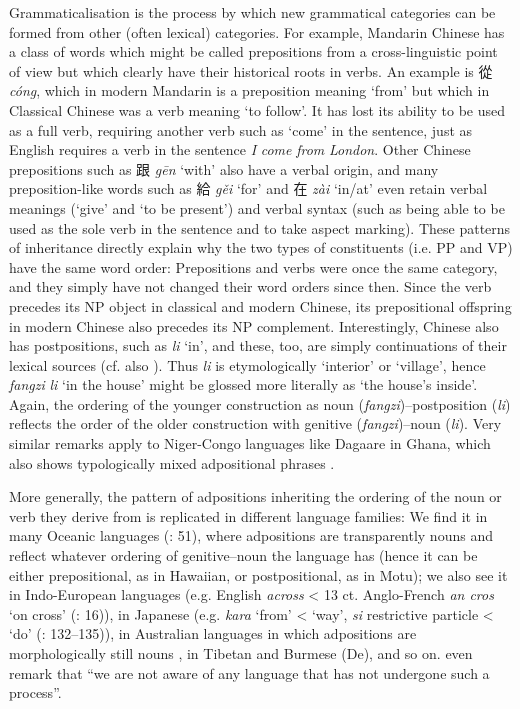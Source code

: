\documentclass[output=paper]{langsci/langscibook}
\begin{document}
Grammaticalisation is the process by which new grammatical categories can be formed from other (often lexical) categories. For example, Mandarin Chinese has a class of words which might be called prepositions from a cross-linguistic point of view but which clearly have their historical roots in verbs. An example is 從 \textit{cóng}, which in modern Mandarin is a preposition meaning ‘from’ but which in Classical Chinese was a verb meaning ‘to follow’. It has lost its ability to be used as a full verb, requiring another verb such as ‘come’ in the sentence, just as English requires a verb in the sentence \textit{I} \textit{come} \textit{from} \textit{London}. Other Chinese prepositions such as 跟 \textit{gēn} ‘with’ also have a verbal origin, and many preposition-like words such as 給 \textit{gěi} ‘for’ and 在 \textit{zài} ‘in/at’ even retain verbal meanings (‘give’ and ‘to be present’) and verbal syntax (such as being able to be used as the sole verb in the sentence and to take aspect marking). These patterns of inheritance directly explain why the two types of constituents (i.e. PP and VP) have the same word order: Prepositions and verbs were once the same category, and they simply have not changed their word orders since then. Since the verb precedes its NP object in classical and modern Chinese, its prepositional offspring in modern Chinese also precedes its NP complement. Interestingly, Chinese also has postpositions, such as \textit{li} ‘in’, and these, too, are simply continuations of their lexical sources (cf. also \citealt{Dryer2019 [this volume]}). Thus \textit{li} is etymologically ‘interior’ or ‘village’, hence \textit{fangzi} \textit{li} ‘in the house’ might be glossed more literally as ‘the house’s inside’. Again, the ordering of the younger construction as noun (\textit{fangzi})–postposition (\textit{li}) reflects the order of the older construction with genitive (\textit{fangzi})–noun (\textit{li}). Very similar remarks apply to Niger-Congo languages like Dagaare in Ghana, which also shows typologically mixed adpositional phrases \citep{Bodomo1997}. 

More generally, the pattern of adpositions inheriting the ordering of the noun or verb they derive from is replicated in different language families: We find it in many Oceanic languages (\citealt{LynchEtAl2002}: 51), where adpositions are transparently nouns and reflect whatever ordering of genitive–noun the language has (hence it can be either prepositional, as in Hawaiian, or postpositional, as in Motu); we also see it in Indo-European languages (e.g. English \textit{across} < 13 ct. Anglo-French \textit{an cros} ‘on cross’ (\citealt{BordetJamet2010}: 16)), in Japanese (e.g. \textit{kara} ‘from’ < ‘way’, \textit{si} restrictive particle < ‘do’ (\citealt{Frellesvig2010}: 132–135)), in Australian languages in which adpositions are morphologically still nouns \citep{Dixon2002}, in Tibetan and Burmese (De\citealt{Lancey1997}), and so on. \citet[62]{HeineKuteva2007} even remark that “we are not aware of any language that has not undergone such a process”.
\end{document}
